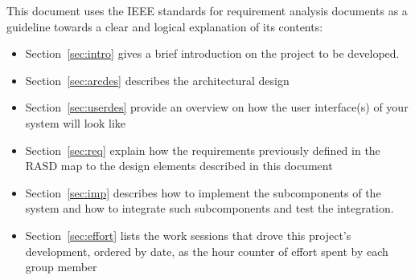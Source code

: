     This document uses the IEEE standards for requirement analysis documents \cite{ieee830} as a guideline towards a clear and logical explanation of its contents:
    \begin{itemize}
      \item Section~\ref{sec:intro} gives a brief introduction on the project to be developed.
      \item Section~\ref{sec:arcdes} describes the architectural design
      \item Section~\ref{sec:userdes} provide an overview on how the user interface(s) of your system will look like
      \item Section~\ref{sec:req} explain how the requirements previously defined in the RASD map to the design elements described in this document
      \item Section~\ref{sec:imp} describes how to implement the subcomponents of the system and how to integrate such subcomponents and test the integration.
      \item Section~\ref{sec:effort} lists the work sessions that drove this project's development, ordered by date, as the hour counter of effort spent by each group member
    \end{itemize}


